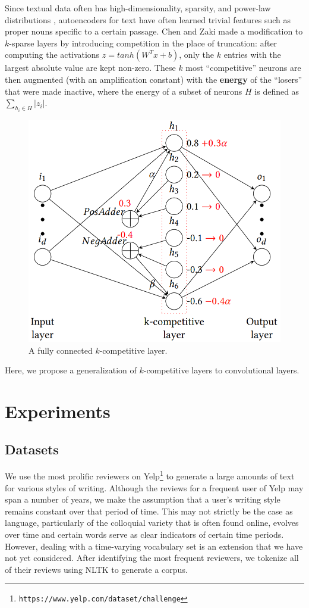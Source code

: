 \documentclass{vldb}
\begin{document}
Since textual data often has high-dimensionality, sparsity, and power-law distributions \cite{KATE}, autoencoders for text have often learned trivial features such as proper nouns specific to a certain passage. Chen and Zaki made a modification to $k$-sparse layers by introducing competition in the place of truncation: after computing the activations $z = tanh(W^Tx + b)$, only the $k$ entries with the largest absolute value are kept non-zero. These $k$ most ``competitive'' neurons are then augmented (with an amplification constant) with the \textbf{energy} of the ``losers'' that were made inactive, where the energy of a subset of neurons $H$ is defined as $\sum_{h_i \in H} |z_i|$. 

\begin{figure}[h]
\centering
\includegraphics[width=.8\linewidth]{k_complayer.png}
\caption{\textmd{A fully connected $k$-competitive layer.}}
\end{figure}

Here, we propose a generalization of $k$-competitive layers to convolutional layers.

\section{Experiments}
\subsection{Datasets}
We use the most prolific reviewers on Yelp\footnote{{\texttt{https://www.yelp.com/dataset/challenge}}} to generate a large amounts of text for various styles of writing. Although the reviews for a frequent user of Yelp may span a number of years, we make the assumption that a user's writing style remains constant over that period of time. This may not strictly be the case as language, particularly of the colloquial variety that is often found online, evolves over time and certain words serve as clear indicators of certain time periods. However, dealing with a time-varying vocabulary set is an extension that we have not yet considered. After identifying the most frequent reviewers, we tokenize all of their reviews using NLTK \cite{Loper02nltk:the} to generate a corpus. 
\end{document}
